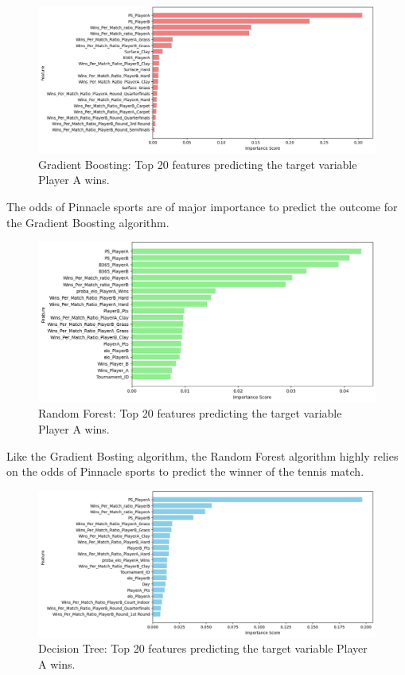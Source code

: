 %
\begin{figure}[h]
\includegraphics[width=\textwidth]{pictures/most_important_gb.png}
\caption{Gradient Boosting: Top 20 features predicting the target variable Player A wins.}
\label{most_important_gb}
\end{figure}
%
The odds of Pinnacle sports are of major importance to predict the outcome for the Gradient Boosting algorithm. 
%
\begin{figure}[h]
\includegraphics[width=\textwidth]{pictures/most_important_rf.png}
\caption{Random Forest: Top 20 features predicting the target variable Player A wins.}
\label{most_important_rf}
\end{figure}
%
Like the Gradient Bosting algorithm, the Random Forest algorithm highly relies on the odds of Pinnacle sports to predict the winner of the tennis match. 
%
\begin{figure}[h]
\includegraphics[width=\textwidth]{pictures/most_important_dt.png}
\caption{Decision Tree: Top 20 features predicting the target variable Player A wins.}
\label{most_important_df}
\end{figure}
